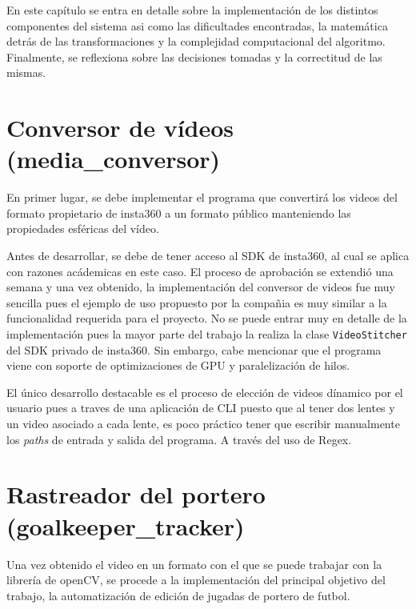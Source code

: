 En este capítulo se entra en detalle sobre la implementación de los distintos componentes del sistema asi como las dificultades encontradas, la matemática detrás de las transformaciones y la complejidad computacional del algoritmo. Finalmente, se reflexiona sobre las decisiones tomadas y la correctitud de las mismas.

\section{Conversor de vídeos (media\_conversor)}

En primer lugar, se debe implementar el programa que convertirá los videos del formato propietario de insta360 a un formato público manteniendo las propiedades esféricas del vídeo.

Antes de desarrollar, se debe de tener acceso al SDK de insta360, al cual se aplica con razones acádemicas en este caso. El proceso de aprobación se extendió una semana y una vez obtenido, la implementación del conversor de videos fue muy sencilla pues el ejemplo de uso propuesto por la compañia es muy similar a la funcionalidad requerida para el proyecto. No se puede entrar muy en detalle de la implementación pues la mayor parte del trabajo la realiza la clase \verb|VideoStitcher| del SDK privado de insta360. Sin embargo, cabe mencionar que el programa viene con soporte de optimizaciones de GPU y paralelización de hilos.

El único desarrollo destacable es el proceso de elección de videos dínamico por el usuario pues a traves de una aplicación de CLI puesto que al tener dos lentes y un video asociado a cada lente, es poco práctico tener que escribir manualmente los \textit{paths} de entrada y salida del programa. A través del uso de Regex.


\vspace{60px}

\section{Rastreador del portero (goalkeeper\_tracker)}

Una vez obtenido el video en un formato con el que se puede trabajar con la librería de openCV, se procede a la implementación del principal objetivo del trabajo, la automatización de edición de jugadas de portero de futbol.

